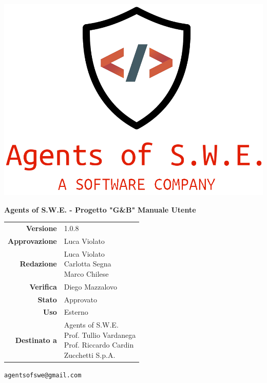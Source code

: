 


\begin{titlepage}
\thispagestyle{empty}

\begin{center}

\includegraphics[scale=0.3]{./images/logo.png} 

\large \textbf{Agents of S.W.E. - Progetto "G\&B"}
\vfill
\Huge \textbf{Manuale Utente}
\vfill
\large
\renewcommand{\arraystretch}{1.3}
\begin{tabular}{r|l}
\textbf{Versione} & 1.0.8\\
\textbf{Approvazione} & Luca Violato\\
\textbf{Redazione} & \parbox[t]{5cm}{Luca Violato\\Carlotta Segna\\Marco Chilese}\\
\textbf{Verifica} & \parbox[t]{5cm}{Diego Mazzalovo}\\
\textbf{Stato} & Approvato\\
\textbf{Uso} & Esterno\\
\textbf{Destinato a} & \parbox[t]{5cm}{Agents of S.W.E. \\Prof. Tullio Vardanega\\Prof. Riccardo Cardin \\ Zucchetti S.p.A.}
\end{tabular}
\vfill
\small
\texttt{agentsofswe@gmail.com}
\end{center}
\end{titlepage}

\pagebreak

